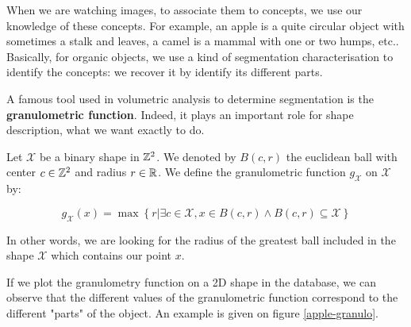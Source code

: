 When we are watching images, to associate them to concepts, we use our knowledge of these concepts. For example, an apple is a quite circular object with sometimes a stalk and leaves, a camel is a mammal with one or two humps, etc.. Basically, for organic objects, we use a kind of segmentation characterisation to identify the concepts: we recover it by identify its different parts.

A famous tool used in volumetric analysis to determine segmentation is the \textbf{granulometric function}. Indeed, it plays an important role for shape description, what we want exactly to do.

\begin{definition}
Let $\mathcal{X}$ be a binary shape in $\mathbb{Z}^{2}$. We denoted by $B(c,r)$ the euclidean ball with center $c \in \mathbb{Z}^{2}$ and radius $r \in \mathbb{R}$. We define the granulometric function $g_{\mathcal{X}}$ on $\mathcal{X}$ by:

$$ g_{\mathcal{X}}(x) = \operatorname{max} \left\{ r | \exists c \in \mathcal{X}, x \in B(c,r) \wedge B(c,r) \subseteq \mathcal{X} \right\} $$ 
\end{definition}

In other words, we are looking for the radius of the greatest ball included in the shape $\mathcal{X}$ which contains our point $x$.

If we plot the granulometry function on a 2D shape in the database, we can observe that the different values of the granulometric function correspond to the different "parts" of the object. An example is given on figure \ref{apple-granulo}.

